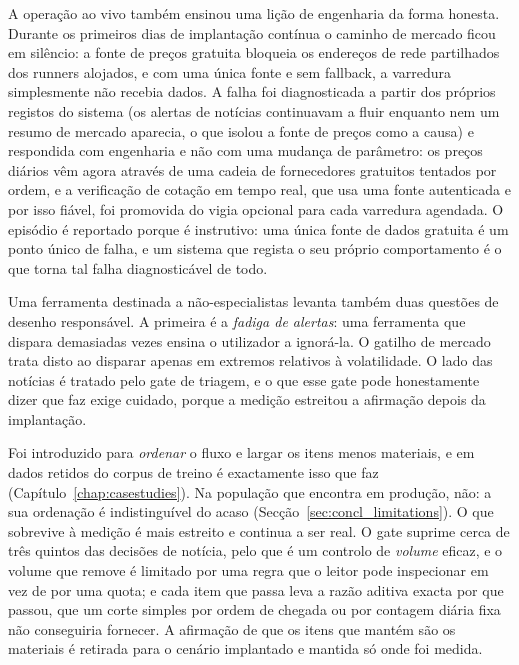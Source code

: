 A operação ao vivo também ensinou uma lição de engenharia da forma honesta. Durante os primeiros dias de
implantação contínua o caminho de mercado ficou em silêncio: a fonte de preços gratuita bloqueia os
endereços de rede partilhados dos runners alojados, e com uma única fonte e sem fallback, a varredura
simplesmente não recebia dados. A falha foi diagnosticada a partir dos próprios registos do sistema (os
alertas de notícias continuavam a fluir enquanto nem um resumo de mercado aparecia, o que isolou a fonte de
preços como a causa) e respondida com engenharia e não com uma mudança de parâmetro: os preços diários vêm
agora através de uma cadeia de fornecedores gratuitos tentados por ordem, e a verificação de cotação em
tempo real, que usa uma fonte autenticada e por isso fiável, foi promovida do vigia opcional para cada
varredura agendada. O episódio é reportado porque é instrutivo: uma única fonte de dados gratuita é um ponto
único de falha, e um sistema que regista o seu próprio comportamento é o que torna tal falha diagnosticável
de todo.

Uma ferramenta destinada a não-especialistas levanta também duas questões de desenho responsável. A primeira
é a \emph{fadiga de alertas}: uma ferramenta que dispara demasiadas vezes ensina o utilizador a ignorá-la. O
gatilho de mercado trata disto ao disparar apenas em extremos relativos à volatilidade. O lado das
notícias é tratado pelo gate de triagem, e o que esse gate pode honestamente dizer que faz exige
cuidado, porque a medição estreitou a afirmação depois da implantação.

Foi introduzido para \emph{ordenar} o fluxo e largar os itens menos materiais, e em dados retidos do
corpus de treino é exactamente isso que faz (Capítulo~\ref{chap:casestudies}). Na população que
encontra em produção, não: a sua ordenação é indistinguível do acaso
(Secção~\ref{sec:concl_limitations}). O que sobrevive à medição é mais estreito e continua a ser real.
O gate suprime cerca de três quintos das decisões de notícia, pelo que é um controlo de \emph{volume}
eficaz, e o volume que remove é limitado por uma regra que o leitor pode inspecionar em vez de por uma
quota; e cada item que passa leva a razão aditiva exacta por que passou, que um corte simples por ordem
de chegada ou por contagem diária fixa não conseguiria fornecer. A afirmação de que os itens que mantém
são os materiais é retirada para o cenário implantado e mantida só onde foi medida.

